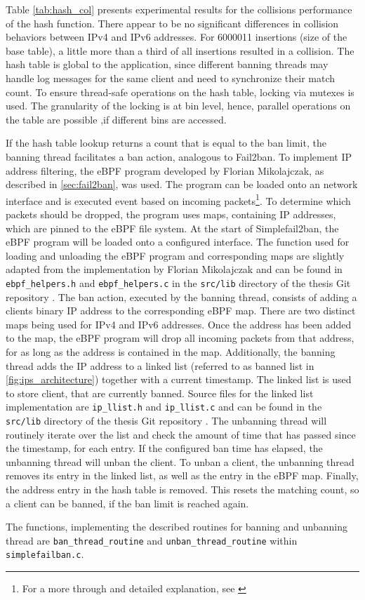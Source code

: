 Table \ref{tab:hash_col} presents experimental results for the collisions performance of the hash function. 
There appear to be no significant differences in collision behaviors between \ac{IPv4} and \ac{IPv6} addresses.
For 6000011 insertions (size of the base table), a little more than a third of all insertions resulted in a collision. 
The hash table is global to the application, since different banning threads may handle log messages for the same
client and need to synchronize their match count. To ensure thread-safe operations on the hash table, locking via mutexes is used.
The granularity of the locking is at bin level, hence, parallel operations on the table are possible ,if different bins are accessed.
\par
If the hash table lookup returns a count that is equal to the ban limit, the banning thread facilitates a ban
action, analogous to Fail2ban. To implement \ac{IP} address filtering, the \ac{eBPF} program developed by Florian Mikolajczak,
 as described in \ref{sec:fail2ban}, was used. The program can be loaded onto an network interface and is executed event based on incoming packets\footnote{For a more through and detailed explanation, see \cite{mikolajczak2022}}.
To determine which packets should be dropped, the program uses maps, containing \ac{IP} addresses, which are pinned to the \ac{eBPF} file system.
At the start of Simplefail2ban, the \ac{eBPF} program will be loaded onto a configured interface. The function used for loading and unloading
the \ac{eBPF} program and corresponding maps are slightly adapted from the implementation by  Florian Mikolajczak and can be found in \texttt{ebpf\_helpers.h}
and \texttt{ebpf\_helpers.c} in the \texttt{src/lib} directory of the thesis Git repository \cite{gitlab}. The ban action, executed by the banning thread,
consists of adding a clients binary \ac{IP} address to the corresponding \ac{eBPF} map. There are two distinct maps being used for \ac{IPv4} and \ac{IPv6} addresses.
Once the address has been added to the map, the \ac{eBPF} program will drop all incoming packets from that address, for as long as the address is contained in the map.
Additionally, the banning thread adds the \ac{IP} address to a linked list (referred to as banned list in \ref{fig:ips_architecture}) together with a 
current timestamp. The linked list is used to store client, that are currently banned. Source files for the linked list implementation are \texttt{ip\_llist.h}
and \texttt{ip\_llist.c} and can be found in the \texttt{src/lib} directory of the thesis Git repository \cite{gitlab}. The unbanning thread will routinely iterate over the list 
and check the amount of time that has passed since the timestamp, for each entry. If the configured ban time has elapsed, the unbanning thread will unban the client.
To unban a client, the unbanning thread removes its entry in the linked list, as well as the entry in the \ac{eBPF} map. Finally, the address entry in the
hash table is removed. This resets the matching count, so a client can be banned, if the ban limit is reached again.
\par
The functions, implementing the described routines for banning and unbanning thread are \texttt{ban\_thread\_routine} 
and \texttt{unban\_thread\_routine} within \texttt{simplefailban.c}.   

